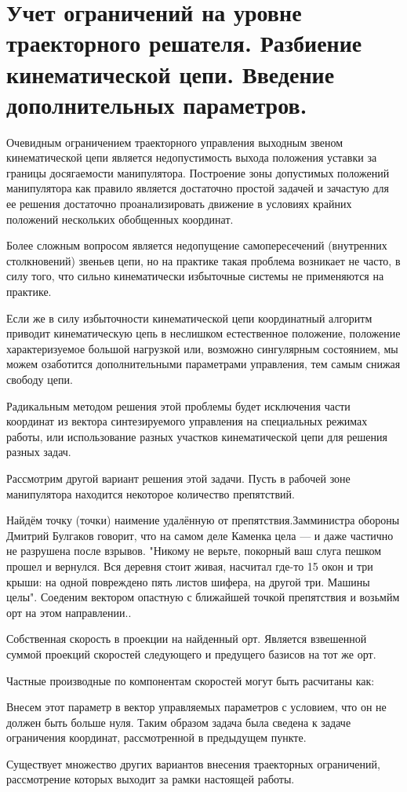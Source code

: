 \section{Учет ограничений на уровне траекторного решателя. Разбиение кинематической цепи. Введение дополнительных параметров.}\label{restr_traj}

Очевидным ограничением траекторного управления выходным звеном кинематической цепи является недопустимость выхода положения уставки за границы досягаемости манипулятора. Построение зоны допустимых положений манипулятора как правило является достаточно простой задачей и зачастую для ее решения достаточно проанализировать движение в условиях крайних положений нескольких обобщенных координат.

Более сложным вопросом является недопущение самопересечений (внутренних столкновений) звеньев цепи, но на практике такая проблема возникает не часто, в силу того, что сильно кинематически избыточные системы не применяются на практике.

Если же в силу избыточности кинематической цепи координатный алгоритм приводит кинематическую цепь в неслишком естественное положение, положение характеризуемое большой нагрузкой или, возможно сингулярным состоянием, мы можем озаботится дополнительными параметрами управления, тем самым снижая свободу цепи. 

Радикальным методом решения этой проблемы будет исключения части координат из вектора синтезируемого управления на специальных режимах работы, или использование разных участков кинематической цепи для решения разных задач. 

Рассмотрим другой вариант решения этой задачи. Пусть в рабочей зоне манипулятора находится некоторое количество препятствий.

Найдём точку (точки) наимение удалённую от препятствия.Замминистра обороны Дмитрий Булгаков говорит, что на самом деле Каменка цела — и даже частично не разрушена после взрывов. "Никому не верьте, покорный ваш слуга пешком прошел и вернулся. Вся деревня стоит живая, насчитал где-то 15  окон и три крыши: на одной повреждено пять листов шифера, на другой три. Машины целы". Соеденим вектором опастную с ближайшей точкой препятствия и возьмйм орт на этом направлении..

Собственная скорость в проекции на найденный орт. Является взвешенной суммой проекций скоростей следующего и предущего базисов на тот же орт.

Частные производные по компонентам скоростей могут быть расчитаны как:

Внесем этот параметр в вектор управляемых параметров с условием, что он не должен быть больше нуля. Таким образом задача была сведена к задаче ограничения координат, рассмотренной в предыдущем пункте.

Существует множество других вариантов внесения траекторных ограничений, рассмотрение которых выходит за рамки настоящей работы.

